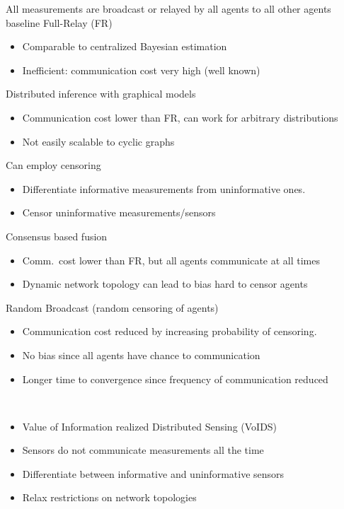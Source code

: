 \documentclass[t, mathserif]{beamer}
\begin{document}
\begin{frame}
\begin{tcolorbox}[width=.25\textwidth,equal height group=A,adjusted title={Existing Methods}]
\begin{itemize}	
	\jtem All measurements are broadcast or relayed by all agents to
        all other agents \njra baseline Full-Relay (FR)
		\begin{itemize}
            \item Comparable to centralized Bayesian estimation
			\item Inefficient: communication cost very high (well known)
		\end{itemize}
	\jtem Distributed inference with graphical models~\cite{DurrantWhyte_DataFusion,
  Weiss_BeliefPropagation, bourgault04b, grimeDw94}
		\begin{itemize}
			\item Communication cost lower than FR, can work for arbitrary distributions
			\item Not easily scalable to cyclic graphs
		\end{itemize}
		\jtem Can employ \alert{censoring} 
\begin{itemize}
			\item Differentiate informative measurements from uninformative ones.
			\item Censor uninformative measurements/sensors
		\end{itemize}
   	\jtem Consensus based fusion
		\begin{itemize}
			\item Comm.\ cost lower than FR, but all agents communicate at all times
			\item Dynamic network topology can lead to bias \njra hard to censor agents
		\end{itemize}
	\jtem Random Broadcast (random censoring of agents)
		\begin{itemize}
			\item Communication cost reduced by increasing probability of censoring. \item No bias since all agents have chance to communication
			\item Longer time to convergence since frequency of communication reduced
		\end{itemize}
\end{itemize}
\end{tcolorbox}\\[2ex]

\begin{tcolorbox}[width=.25\textwidth,after=\hfill,equal height group=B,adjusted title=Our Method: Efficient Distributed Inference]
\begin{itemize}
	\item Value of Information realized Distributed Sensing (VoIDS)
		\bii
			\item Sensors do not communicate measurements all the time
			\item Differentiate between informative and uninformative sensors
			\item Relax restrictions on network topologies 
		\ei



\end{itemize}
\end{tcolorbox}
\end{frame}
\end{document}
